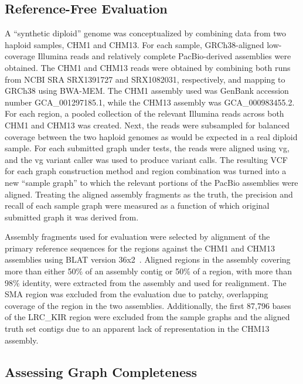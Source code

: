 \subsection{Reference-Free Evaluation}

A ``synthetic diploid'' genome was conceptualized by combining data from
two haploid samples, CHM1 and CHM13\cite{Steinberg2014-pu}. For each
sample, GRCh38-aligned low-coverage Illumina reads and relatively
complete PacBio-derived assemblies were obtained. The CHM1 and CHM13
reads were obtained by combining both runs from NCBI SRA SRX1391727 and
SRX1082031, respectively, and mapping to GRCh38 using
BWA-MEM\cite{Li2009-tj}. The CHM1 assembly used was GenBank accession
number GCA\_001297185.1, while the CHM13 assembly was GCA\_000983455.2.
For each region, a pooled collection of the relevant Illumina reads
across both CHM1 and CHM13 was created. Next, the reads were subsampled
for balanced coverage between the two haploid genomes as would be
expected in a real diploid sample. For each submitted graph under tests,
the reads were aligned using vg, and the vg variant caller was used to
produce variant calls. The resulting VCF for each graph construction
method and region combination was turned into a new ``sample graph'' to
which the relevant portions of the PacBio assemblies were aligned.
Treating the aligned assembly fragments as the truth, the precision and
recall of each sample graph were measured as a function of which
original submitted graph it was derived from.

Assembly fragments used for evaluation were selected by alignment of the
primary reference sequences for the regions against the CHM1 and CHM13
assemblies using BLAT version 36x2~\cite{Kent2002-wo}. Aligned regions
in the assembly covering more than either 50\% of an assembly contig or
50\% of a region, with more than 98\% identity, were extracted from the
assembly and used for realignment. The SMA region was excluded from the
evaluation due to patchy, overlapping coverage of the region in the two
assemblies. Additionally, the first 87,796 bases of the LRC\_KIR region
were excluded from the sample graphs and the aligned truth set contigs
due to an apparent lack of representation in the CHM13 assembly.

\subsection{Assessing Graph Completeness}

